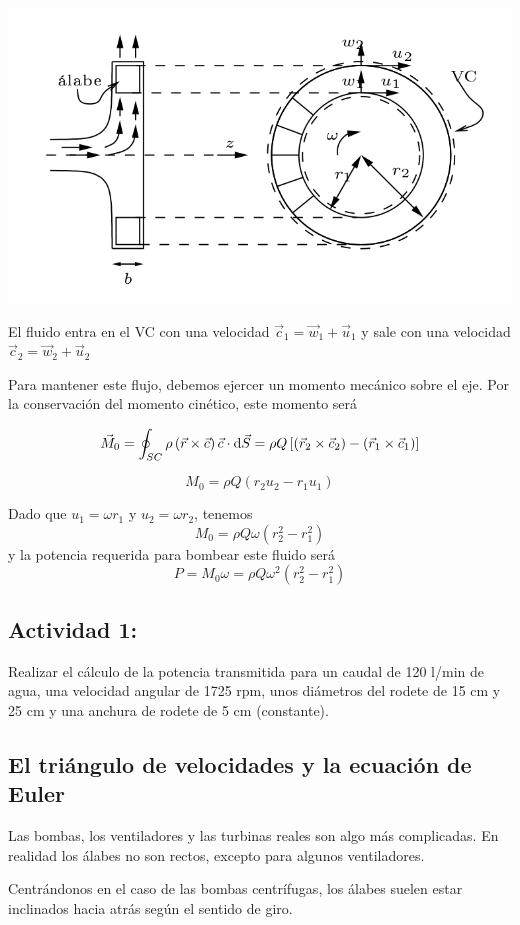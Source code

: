 \begin{center}
	\includegraphics[width=0.5\linewidth]{TeX_files/chapter04-Dinamica/rodete1}
\end{center}

El fluido entra en el VC con una velocidad $\vec{c}_{1}=\vec{w}_{1}+\vec{u}_{1}$
y sale con una velocidad $\vec{c}_{2}=\vec{w}_{2}+\vec{u}_{2}$

Para mantener este flujo, debemos ejercer un momento mecánico sobre
el eje. Por la conservación del momento cinético, este momento será

\[
\vec{M}_{0}=\oint_{SC}\rho\left(\vec{r}\times\vec{c}\right)\vec{c}\cdot\text{d}\vec{S}=\rho Q\left[\left(\vec{r}_{2}\times\vec{c}_{2}\right)-\left(\vec{r}_{1}\times\vec{c}_{1}\right)\right]
\]

\[
M_{0}=\rho Q\left(r_{2}u_{2}-r_{1}u_{1}\right)
\]

Dado que $u_{1}=\omega r_{1}$ y $u_{2}=\omega r_{2}$, tenemos 
\[
M_{0}=\rho Q\omega\left(r_{2}^{2}-r_{1}^{2}\right)
\]
y la potencia requerida para bombear este fluido será 
\[
P=M_{0}\omega=\rho Q\omega^{2}\left(r_{2}^{2}-r_{1}^{2}\right)
\]


\subsection*{Actividad 1:}
	Realizar el cálculo de la potencia transmitida para un caudal de
	120 l/min de agua, una velocidad angular de 1725 rpm, unos diámetros
	del rodete de 15 cm y 25 cm y una anchura de rodete de 5 cm (constante).

\subsection{El triángulo de velocidades y la ecuación de Euler}


Las bombas, los ventiladores y las turbinas reales son algo más complicadas.
En realidad los álabes no son rectos, excepto para algunos ventiladores.

Centrándonos en el caso de las bombas centrífugas, los álabes suelen
estar inclinados hacia atrás según el sentido de giro. 

